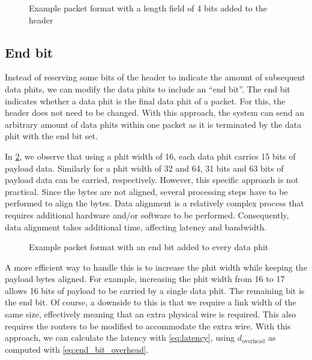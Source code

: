 \hspace*{0.5em}
\begin{figure}[hbtp]
    \centering
    \begin{adjustbox}{width=0.8\linewidth}
        
    \end{adjustbox}
    \caption{Example packet format with a length field of 4 bits added to the header}
    \label{fig:example_packet_format_length_field}
\end{figure}

\subsection{End bit}
Instead of reserving some bits of the header to indicate the amount of subsequent data phits, we can modify the data phits to include an ``end bit''.
The end bit indicates whether a data phit is the final data phit of a packet.
For this, the header does not need to be changed.
With this approach, the system can send an arbitrary amount of data phits within one packet as it is terminated by the data phit with the end bit set.

In \cref{fig:example_packet_format_end_bit}, we observe that using a phit width of 16, each data phit carries 15 bits of payload data.
Similarly for a phit width of 32 and 64, 31 bits and 63 bits of payload data can be carried, respectively.
However, this specific approach is not practical.
Since the bytes are not aligned, several processing steps have to be performed to align the bytes.
Data alignment is a relatively complex process that requires additional hardware and/or software to be performed.
Consequently, data alignment takes additional time, affecting latency and bandwidth. 

\hspace*{0.5em}
\begin{figure}[hbtp]
    \centering
    \begin{adjustbox}{width=0.8\linewidth}
        
    \end{adjustbox}
    \caption{Example packet format with an end bit added to every data phit}
    \label{fig:example_packet_format_end_bit}
\end{figure}

A more efficient way to handle this is to increase the phit width while keeping the payload bytes aligned.
For example, increasing the phit width from 16 to 17 allows 16 bits of payload to be carried by a single data phit.
The remaining bit is the end bit.
Of course, a downside to this is that we require a link width of the same size, effectively meaning that an extra physical wire is required.
This also requires the routers to be modified to accommodate the extra wire.
With this approach, we can calculate the latency with \cref{eq:latency}, using $d_{\text{overhead}}$ as computed with \cref{eq:end_bit_overhead}. 


